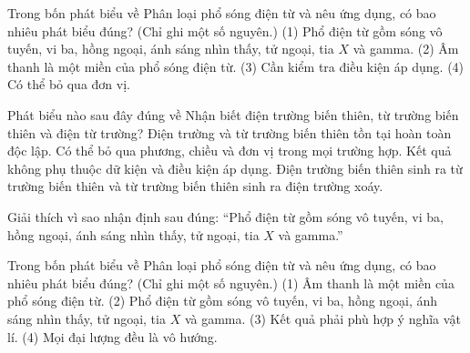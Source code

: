 \begin{ex}
Trong bốn phát biểu về Phân loại phổ sóng điện từ và nêu ứng dụng, có bao nhiêu phát biểu đúng? (Chỉ ghi một số nguyên.) (1) Phổ điện từ gồm sóng vô tuyến, vi ba, hồng ngoại, ánh sáng nhìn thấy, tử ngoại, tia $X$ và gamma. (2) Âm thanh là một miền của phổ sóng điện từ. (3) Cần kiểm tra điều kiện áp dụng. (4) Có thể bỏ qua đơn vị.
\end{ex}

\begin{ex}
Phát biểu nào sau đây đúng về Nhận biết điện trường biến thiên, từ trường biến thiên và điện từ trường?
\choice
{Điện trường và từ trường biến thiên tồn tại hoàn toàn độc lập.}
{Có thể bỏ qua phương, chiều và đơn vị trong mọi trường hợp.}
{Kết quả không phụ thuộc dữ kiện và điều kiện áp dụng.}
{\True Điện trường biến thiên sinh ra từ trường biến thiên và từ trường biến thiên sinh ra điện trường xoáy.}
\end{ex}

\begin{bt}
Giải thích vì sao nhận định sau đúng: “Phổ điện từ gồm sóng vô tuyến, vi ba, hồng ngoại, ánh sáng nhìn thấy, tử ngoại, tia $X$ và gamma.”
\end{bt}

\begin{ex}
Trong bốn phát biểu về Phân loại phổ sóng điện từ và nêu ứng dụng, có bao nhiêu phát biểu đúng? (Chỉ ghi một số nguyên.) (1) Âm thanh là một miền của phổ sóng điện từ. (2) Phổ điện từ gồm sóng vô tuyến, vi ba, hồng ngoại, ánh sáng nhìn thấy, tử ngoại, tia $X$ và gamma. (3) Kết quả phải phù hợp ý nghĩa vật lí. (4) Mọi đại lượng đều là vô hướng.
\end{ex}

